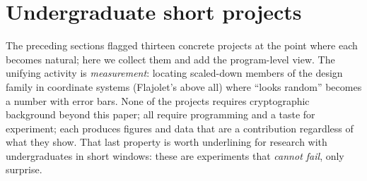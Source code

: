 \section{Undergraduate short projects}\label{sec:projects}

The preceding sections flagged thirteen concrete projects at the point where
each becomes natural; here we collect them and add the program-level view.
The unifying activity is \emph{measurement}: locating scaled-down members
of the \SHA{} design family in coordinate systems (Flajolet's above all)
where ``looks random'' becomes a number with error bars. None of the
projects requires cryptographic background beyond this paper; all require
programming and a taste for experiment; each produces figures and data
that are a contribution regardless of what they show. That last property
is worth underlining for research with undergraduates in short windows:
these are experiments that \emph{cannot fail}, only surprise.

